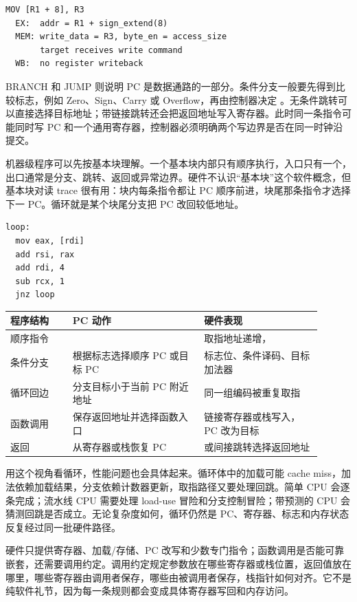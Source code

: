 \begin{lstlisting}
MOV [R1 + 8], R3
  EX:  addr = R1 + sign_extend(8)
  MEM: write_data = R3, byte_en = access_size
       target receives write command
  WB:  no register writeback
\end{lstlisting}

BRANCH 和 JUMP 则说明 PC 是数据通路的一部分。条件分支一般要先得到比较标志，例如 Zero、Sign、Carry 或 Overflow，再由控制器决定 。无条件跳转可以直接选择目标地址；带链接跳转还会把返回地址写入寄存器。此时同一条指令可能同时写 PC 和一个通用寄存器，控制器必须明确两个写边界是否在同一时钟沿提交。

机器级程序可以先按基本块理解。一个基本块内部只有顺序执行，入口只有一个，出口通常是分支、跳转、返回或异常边界。硬件不认识“基本块”这个软件概念，但基本块对读 trace 很有用：块内每条指令都让 PC 顺序前进，块尾那条指令才选择下一 PC。循环就是某个块尾分支把 PC 改回较低地址。

\begin{lstlisting}
loop:
  mov eax, [rdi]
  add rsi, rax
  add rdi, 4
  sub rcx, 1
  jnz loop
\end{lstlisting}

\begin{longtable}{L{0.18\linewidth}L{0.38\linewidth}L{0.34\linewidth}}
\toprule
程序结构 & PC 动作 & 硬件表现 \\
\midrule
顺序指令 &  & 取指地址递增， \\
条件分支 & 根据标志选择顺序 PC 或目标 PC & 标志位、条件译码、目标加法器 \\
循环回边 & 分支目标小于当前 PC 附近地址 & 同一组编码被重复取指 \\
函数调用 & 保存返回地址并选择函数入口 & 链接寄存器或栈写入，PC 改为目标 \\
返回 & 从寄存器或栈恢复 PC &  或间接跳转选择返回地址 \\
\bottomrule
\end{longtable}

用这个视角看循环，性能问题也会具体起来。循环体中的加载可能 cache miss，加法依赖加载结果，分支依赖计数器更新，取指路径又要处理回跳。简单 CPU 会逐条完成；流水线 CPU 需要处理 load-use 冒险和分支控制冒险；带预测的 CPU 会猜测回跳是否成立。无论复杂度如何，循环仍然是 PC、寄存器、标志和内存状态反复经过同一批硬件路径。

硬件只提供寄存器、加载/存储、PC 改写和少数专门指令；函数调用是否能可靠嵌套，还需要调用约定。调用约定规定参数放在哪些寄存器或栈位置，返回值放在哪里，哪些寄存器由调用者保存，哪些由被调用者保存，栈指针如何对齐。它不是纯软件礼节，因为每一条规则都会变成具体寄存器写回和内存访问。

